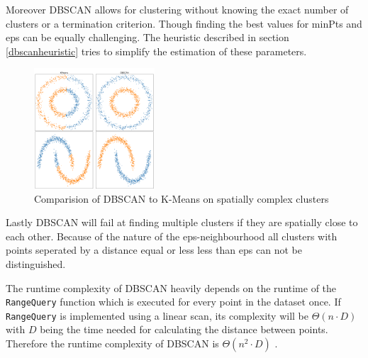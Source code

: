 Moreover DBSCAN allows for clustering without knowing the exact number of clusters or a termination criterion. Though finding the best values for minPts and eps can be equally challenging. The heuristic described in section \ref{dbscanheuristic} tries to simplify the estimation of these parameters.
\begin{figure}
    \centering
    \includegraphics[width=0.4\textwidth]{../plots/dbscan/dbscan_comp}
    \caption{Comparision of DBSCAN to K-Means on spatially complex clusters}
    \label{fig:dbscanadv}
\end{figure}

Lastly DBSCAN will fail at finding multiple clusters if they are spatially close to each other. Because of the nature of the eps-neighbourhood all clusters with points seperated by a distance equal or less less than eps can not be distinguished.

The runtime complexity of DBSCAN heavily depends on the runtime of the \texttt{RangeQuery} function which is executed for every point in the dataset once.
If \texttt{RangeQuery} is implemented using a linear scan, its complexity will be $\Theta (n \cdot D)$ with $D$ being the time needed for calculating the distance between points. Therefore the runtime complexity of DBSCAN is $\Theta(n^2 \cdot D)$ \cite{dbscanrevisited}.